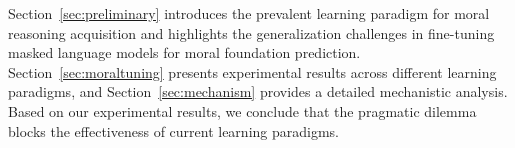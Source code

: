 Section~\ref{sec:preliminary} introduces the prevalent learning paradigm for moral reasoning acquisition and highlights the generalization challenges in fine-tuning masked language models for moral foundation prediction. Section~\ref{sec:moraltuning} presents experimental results across different learning paradigms, and Section~\ref{sec:mechanism} provides a detailed mechanistic analysis. Based on our experimental results, we conclude that the pragmatic dilemma blocks the effectiveness of current learning paradigms.


